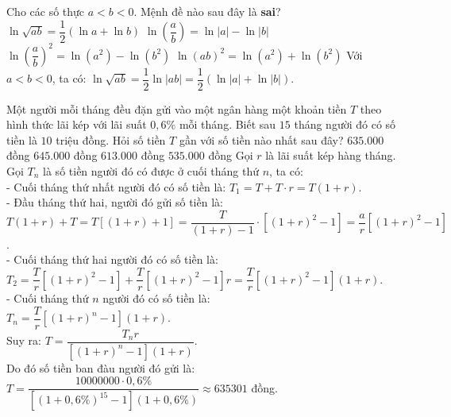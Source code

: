\begin{ex}%
 Cho các số thực $a < b < 0$. Mệnh đề nào sau đây là \textbf{sai}?
 \choice
  {\True $\ln \sqrt{ab} = \dfrac{1}{2} \left( \ln a + \ln b \right)$}
  {$\ln \left( \dfrac{a}{b} \right) = \ln|a| - \ln|b|$}
  {$\ln \left( \dfrac{a}{b} \right)^2 = \ln(a^2) - \ln(b^2)$}
  {$\ln(ab)^2 = \ln(a^2) + \ln(b^2)$}
 \loigiai
  {
  Với $a < b < 0$, ta có: $\ln \sqrt{ab} = \dfrac{1}{2} \ln |ab| = \dfrac{1}{2} \left( \ln |a| + \ln |b|\right)$.
  }
\end{ex}


\begin{ex}%
 Một người mỗi tháng đều đặn gửi vào một ngân hàng một khoản tiền $T$ theo hình thức lãi kép với lãi suất $0{,}6 \%$ mỗi tháng. Biết sau $15$ tháng người đó có số tiền là $10$ triệu đồng. Hỏi số tiền $T$ gần với số tiền nào nhất sau đây?
 \choice
  {\True $635.000$ đồng}
  {$645.000$ đồng}
  {$613.000$ đồng}
  {$535.000$ đồng}
 \loigiai
  {
  Gọi $r$ là lãi suất kép hàng tháng.\\
  Gọi $T_{n}$ là số tiền người đó có được ở cuối tháng thứ $n$, ta có:\\
  - Cuối tháng thứ nhất người đó có số tiền là: $T_1 = T + T \cdot r = T(1+r)$.\\
  - Đầu tháng thứ hai, người đó gửi số tiền là:\\
   $T(1+r) + T = T \left[(1+r) + 1\right] = \dfrac{T}{(1+r)-1} \cdot \left[(1+r)^2-1\right] = \dfrac{a}{r}\left[(1+r)^2 - 1\right]$.\\
  - Cuối tháng thứ hai người đó có số tiền là:\\
   $T_2 = \dfrac{T}{r}\left[(1+r)^2 - 1\right] + \dfrac{T}{r}\left[(1+r)^2 - 1\right]r = \dfrac{T}{r}\left[(1+r)^2 - 1\right](1+r)$.\\
   \dotfill
   - Cuối tháng thứ $n$ người đó có số tiền là:\\
   $T_n = \dfrac{T}{r}\left[(1+r)^n - 1\right](1+r)$.\\
   Suy ra: $T = \dfrac{T_n r}{\left[(1+r)^n - 1\right](1+r)}$.\\
   Do đó số tiền ban đàu người đó gửi là:\\
   $T = \dfrac{10000000 \cdot 0{,}6\%}{\left[(1 + 0{,}6\%)^{15} - 1\right](1+ 0{,}6\%)} \approx 635301$ đồng.
  }
\end{ex}


